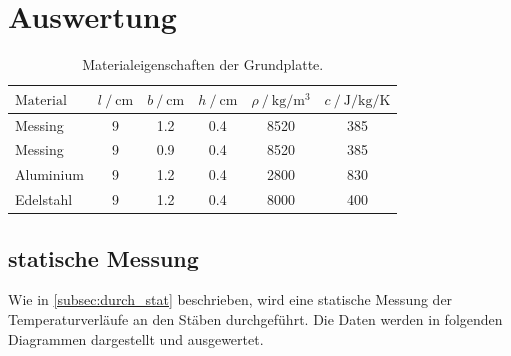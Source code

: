 \section{Auswertung}
\label{sec:Auswertung}

\begin{table}
  \centering
  \caption{Materialeigenschaften der Grundplatte. \cite{V204}}
  \label{tab:1}
  \begin{tabular}{l S S S S S }
    \toprule
    {$\text{Material}$} & {$l \:/\: \si{\centi\metre}$} & {$b \:/\: \si{\centi\metre}$} & {$h \:/\: \si{\centi\metre}$} & {$\rho \:/\: \si{\kilo\gram\per\metre\tothe{3}}$} & {$c \:/\: \si{\joule\per\kilo\gram\per\kelvin} $} \\
    \midrule
    Messing  & 9 & 1.2 & 0.4 & 8520 & 385 \\
    Messing  & 9 & 0.9 & 0.4 & 8520 & 385 \\
    Aluminium  & 9 & 1.2 & 0.4 & 2800 & 830 \\
    Edelstahl  & 9 & 1.2 & 0.4 & 8000 & 400 \\
    \bottomrule
  \end{tabular}
\end{table}


\subsection{statische Messung}
\label{subsec:aus_stat}
Wie in \autoref{subsec:durch_stat} beschrieben, wird eine statische Messung der Temperaturverläufe an den Stäben durchgeführt. 
Die Daten werden in folgenden Diagrammen dargestellt und ausgewertet.

